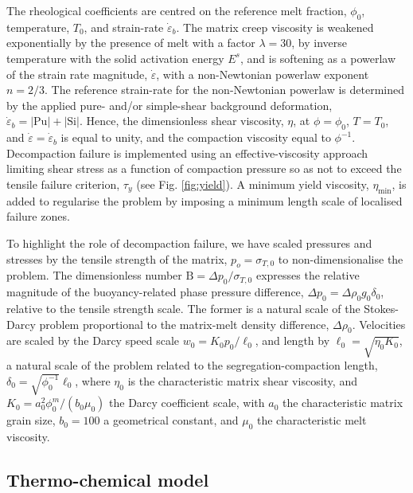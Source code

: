 \documentclass[12pt,a4paper]{article}
\begin{document}
The rheological coefficients are centred on the reference melt fraction, $\phi_0$, temperature, $T_0$, and strain-rate $\dot{\varepsilon}_b$. The matrix creep viscosity is weakened exponentially by the presence of melt with a factor $\lambda=30$, by inverse temperature with the solid activation energy $E^s$,  and is softening as a powerlaw of the strain rate magnitude, $\dot{\varepsilon}$, with a non-Newtonian powerlaw exponent $n=2/3$. The reference strain-rate for the non-Newtonian powerlaw is determined by the applied pure- and/or simple-shear background deformation, $\dot{\varepsilon}_b = |\mathrm{Pu}| + |\mathrm{Si}|$. Hence, the dimensionless shear viscosity, $\eta$, at $\phi = \phi_0$, $T = T_0$, and $\dot{\varepsilon} = \dot{\varepsilon}_b$ is equal to unity, and the compaction viscosity equal to $\phi^{-1}$. Decompaction failure is implemented using an effective-viscosity approach limiting shear stress as a function of compaction pressure so as not to exceed the tensile failure criterion, $\tau_y$ (see Fig. \ref{fig:yield}). A minimum yield viscosity, $\eta_\mathrm{min}$, is added to regularise the problem by imposing a minimum length scale of localised failure zones.

To highlight the role of decompaction failure, we have scaled pressures and stresses by the tensile strength of the matrix, $p_o = \sigma_{T,0}$ to non-dimensionalise the problem. The dimensionless number $\mathrm{B} = \Delta p_0 / \sigma_{T,0}$ expresses the relative magnitude of the buoyancy-related phase pressure difference, $ \Delta p_0 = \Delta \rho_0 g_0 \delta_0$, relative to the tensile strength scale. The former is a natural scale of the Stokes-Darcy problem proportional to the matrix-melt density difference, $\Delta \rho_0$. Velocities are scaled by the Darcy speed scale $w_0 = K_0 p_0/\ell_0$, and length by $\ell_0 = \sqrt{\eta_0 K_0}$, a natural scale of the problem related to the segregation-compaction length, $\delta_0 =  \sqrt{\phi_0^{-1}} \ell_0$, where $\eta_0$ is the characteristic matrix shear viscosity, and $K_0 = a_0^2 \phi_0^m / (b_0 \mu_0)$ the Darcy coefficient scale, with $a_0$ the characteristic matrix grain size, $b_0 = 100$ a geometrical constant, and $\mu_0$ the characteristic melt viscosity.

\subsection{Thermo-chemical model}
\end{document}
